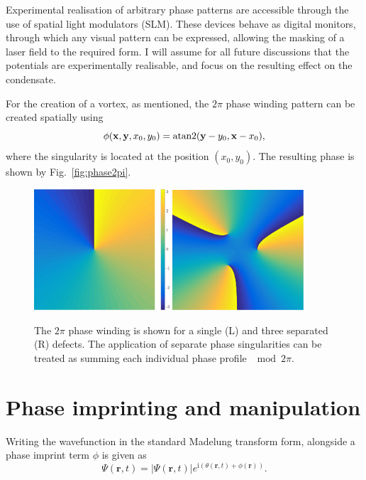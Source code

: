 Experimental realisation of arbitrary phase patterns are accessible through the use of spatial light modulators (SLM). These devices behave as digital monitors, through which any visual pattern can be expressed, allowing the masking of a laser field to the required form. I will assume for all future discussions that the potentials are experimentally realisable, and focus on the resulting effect on the condensate.

For the creation of a vortex, as mentioned, the $2\pi$ phase winding pattern can be created spatially using
\begin{equation}
    \phi(\mathbf{x},\mathbf{y},x_0,y_0) = \operatorname*{atan2}(\mathbf{y}-y_0,\mathbf{x}-x_0),
\end{equation}
where the singularity is located at the position $\left(x_0,y_0\right)$. The resulting phase is shown by Fig.~\ref{fig:phase2pi}.
\begin{figure}\centering
    \includegraphics[width=0.45\textwidth]{Images/ch4_vtx/2pi.pdf}
    \includegraphics[width=0.435\textwidth]{Images/ch4_vtx/3_2pi.pdf}
    \caption{The $2\pi$ phase winding is shown for a single (L) and three separated (R) defects. The application of separate phase singularities can be treated as summing each individual phase profile $\mod 2\pi$.}\label{fig:atan2phase}
\end{figure}

\section{Phase imprinting and manipulation}
Writing the wavefunction in the standard Madelung transform form, alongside a phase imprint term $\phi$ is given as
\begin{equation}
    \Psi(\mathbf{r},t) = |\Psi(\mathbf{r},t)|e^{\text{i}(\theta(\mathbf{r},t) + \phi(\mathbf{r}))}.
\end{equation}

